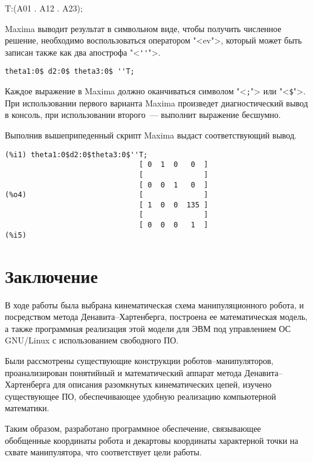 \documentclass[oneside, final, 14pt]{extarticle}
\begin{document}
{{\small
\begin{listing}{66}
T:(A01 . A12 . A23);
\end{listing}
}
\par
Maxima выводит результат в символьном виде, чтобы получить численное решение, необходимо воспользоваться оператором "<{\ttfamily ev}">, который может быть записан также как два апострофа "<{\ttfamily \verb|''|}">.

{\small
\begin{verbatim}
theta1:0$ d2:0$ theta3:0$ ''T;
\end{verbatim}
}
\par
Каждое выражение в Maxima должно оканчиваться символом "<{\ttfamily \verb|;|}"> или "<{\ttfamily \verb|$|}">.
При использовании первого варианта Maxima произведет диагностический вывод в консоль, при использовании второго~--- выполнит выражение бесшумно.
\par
Выполнив вышеприпеденный скрипт Maxima выдаст соответствующий вывод.
\par

\begin{minipage}{1\textwidth}
{\small
\begin{verbatim}
(%i1) theta1:0$d2:0$theta3:0$''T;
                               [ 0  1  0   0  ]
                               [              ]
                               [ 0  0  1   0  ]
(%o4)                          [              ]
                               [ 1  0  0  135 ]
                               [              ]
                               [ 0  0  0   1  ]
(%i5) 
\end{verbatim}
}
\end{minipage}

\newpage

\section*{Заключение}

В ходе работы была выбрана кинематическая схема манипуляционного робота, и посредством метода Денавита--Хартенберга, построена ее математическая модель, а также программная реализация этой модели для ЭВМ под управлением ОС GNU/Linux с использованием свободного ПО.
\par
Были рассмотрены существующие конструкции роботов--манипуляторов, проанализирован понятийный и математический аппарат метода Денавита--Хартенберга для описания разомкнутых кинематических цепей, изучено существующее ПО, обеспечивающее удобную реализацию компьютерной математики.
\par
Таким образом, разработано программное обеспечение, связывающее обобщенные координаты робота и декартовы координаты характерной точки на схвате манипулятора, что соответствует цели работы.

}
\end{document}
